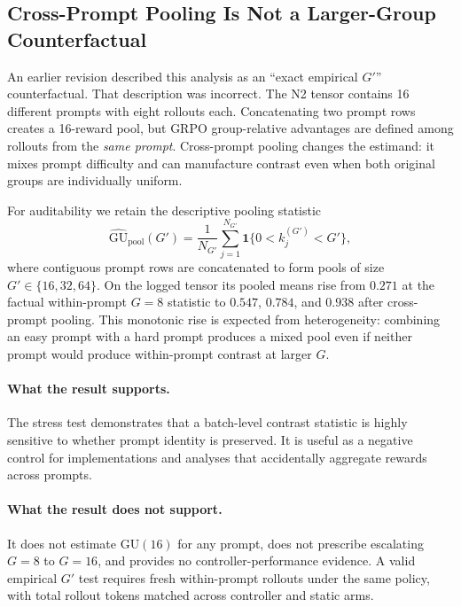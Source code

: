 \label{sec:p7-iter203-empirical-gprime}

\subsection{Cross-Prompt Pooling Is Not a Larger-Group Counterfactual}

An earlier revision described this analysis as an ``exact empirical $G'$''
counterfactual. That description was incorrect. The N2 tensor contains 16
different prompts with eight rollouts each. Concatenating two prompt rows creates
a 16-reward pool, but GRPO group-relative advantages are defined among rollouts
from the \emph{same prompt}. Cross-prompt pooling changes the estimand: it mixes
prompt difficulty and can manufacture contrast even when both original groups
are individually uniform.

For auditability we retain the descriptive pooling statistic
\[
\widehat{\mathrm{GU}}_{\mathrm{pool}}(G')=
\frac{1}{N_{G'}}\sum_{j=1}^{N_{G'}}
\mathbf{1}\{0<k_j^{(G')}<G'\},
\]
where contiguous prompt rows are concatenated to form pools of size
$G'\in\{16,32,64\}$. On the logged tensor its pooled means rise from $0.271$
at the factual within-prompt $G=8$ statistic to $0.547$, $0.784$, and $0.938$
after cross-prompt pooling. This monotonic rise is expected from heterogeneity:
combining an easy prompt with a hard prompt produces a mixed pool even if neither
prompt would produce within-prompt contrast at larger $G$.

\paragraph{What the result supports.}
The stress test demonstrates that a batch-level contrast statistic is highly
sensitive to whether prompt identity is preserved. It is useful as a negative
control for implementations and analyses that accidentally aggregate rewards
across prompts.

\paragraph{What the result does not support.}
It does not estimate $\mathrm{GU}(16)$ for any prompt, does not prescribe
escalating $G=8$ to $G=16$, and provides no controller-performance evidence.
A valid empirical $G'$ test requires fresh within-prompt rollouts under the same
policy, with total rollout tokens matched across controller and static arms.

